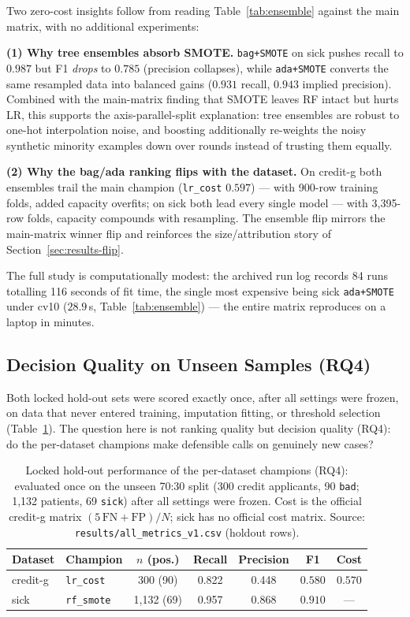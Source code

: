 Two zero-cost insights follow from reading Table~\ref{tab:ensemble} against the main matrix, with no additional experiments:

\textbf{(1) Why tree ensembles absorb SMOTE.} \texttt{bag+SMOTE} on sick pushes recall to $0.987$ but F1 \emph{drops} to $0.785$ (precision collapses), while \texttt{ada+SMOTE} converts the same resampled data into balanced gains ($0.931$ recall, $0.943$ implied precision). Combined with the main-matrix finding that SMOTE leaves RF intact but hurts LR, this supports the axis-parallel-split explanation: tree ensembles are robust to one-hot interpolation noise, and boosting additionally re-weights the noisy synthetic minority examples down over rounds instead of trusting them equally.

\textbf{(2) Why the bag/ada ranking flips with the dataset.} On credit-g both ensembles trail the main champion (\texttt{lr\_cost} $0.597$) --- with 900-row training folds, added capacity overfits; on sick both lead every single model --- with 3{,}395-row folds, capacity compounds with resampling. The ensemble flip mirrors the main-matrix winner flip and reinforces the size/attribution story of Section~\ref{sec:results-flip}.

The full study is computationally modest: the archived run log records 84 runs totalling 116 seconds of fit time, the single most expensive being sick \texttt{ada+SMOTE} under cv10 ($28.9$\,s, Table~\ref{tab:ensemble}) --- the entire matrix reproduces on a laptop in minutes.

\subsection{Decision Quality on Unseen Samples (RQ4)}
\label{sec:results-holdout}

Both locked hold-out sets were scored exactly once, after all settings were frozen, on data that never entered training, imputation fitting, or threshold selection (Table~\ref{tab:holdout}). The question here is not ranking quality but decision quality (RQ4): do the per-dataset champions make defensible calls on genuinely new cases?

\begin{table}[H]
\centering
\caption{Locked hold-out performance of the per-dataset champions (RQ4): evaluated once on the unseen 70:30 split (300 credit applicants, 90 \texttt{bad}; 1{,}132 patients, 69 \texttt{sick}) after all settings were frozen. Cost is the official credit-g matrix $(5\,\mathrm{FN}+\mathrm{FP})/N$; sick has no official cost matrix. Source: \texttt{results/all\_metrics\_v1.csv} (holdout rows).}
\label{tab:holdout}
\begin{tabular}{llcccc c}
\toprule
Dataset & Champion & $n$ (pos.) & Recall & Precision & F1 & Cost \\
\midrule
credit-g & \texttt{lr\_cost} & 300 (90) & 0.822 & 0.448 & $\mathbf{0.580}$ & $\mathbf{0.570}$ \\
sick & \texttt{rf\_smote} & 1{,}132 (69) & 0.957 & 0.868 & $\mathbf{0.910}$ & --- \\
\bottomrule
\end{tabular}
\end{table}

